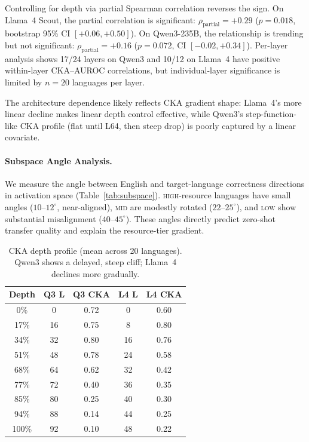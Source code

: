 \documentclass[11pt,a4paper]{article}
\newcommand{\auroc}{AUROC}
\begin{document}
Controlling for depth via partial Spearman correlation reverses the sign. On Llama~4 Scout, the partial correlation is significant: $\rho_{\text{partial}}=+0.29$ ($p=0.018$, bootstrap 95\% CI $[+0.06, +0.50]$). On Qwen3-235B, the relationship is trending but not significant: $\rho_{\text{partial}}=+0.16$ ($p=0.072$, CI $[-0.02, +0.34]$). Per-layer analysis shows 17/24 layers on Qwen3 and 10/12 on Llama~4 have positive within-layer CKA--\auroc{} correlations, but individual-layer significance is limited by $n=20$ languages per layer.

The architecture dependence likely reflects CKA gradient shape: Llama~4's more linear decline makes linear depth control effective, while Qwen3's step-function-like CKA profile (flat until L64, then steep drop) is poorly captured by a linear covariate.

\paragraph{Subspace Angle Analysis.}
We measure the angle between English and target-language correctness directions in activation space (Table~\ref{tab:subspace}). \textsc{high}-resource languages have small angles ($10$--$12^\circ$, near-aligned), \textsc{mid} are modestly rotated ($22$--$25^\circ$), and \textsc{low} show substantial misalignment ($40$--$45^\circ$). These angles directly predict zero-shot transfer quality and explain the resource-tier gradient.

\begin{table}[t]
\centering
\small
\begin{tabular}{ccccc}
\toprule
Depth & Q3 L & Q3 CKA & L4 L & L4 CKA \\
\midrule
0\%  & 0  & 0.72 & 0  & 0.60 \\
17\% & 16 & 0.75 & 8  & 0.80 \\
34\% & 32 & 0.80 & 16 & 0.76 \\
51\% & 48 & 0.78 & 24 & 0.58 \\
68\% & 64 & 0.62 & 32 & 0.42 \\
77\% & 72 & 0.40 & 36 & 0.35 \\
85\% & 80 & 0.25 & 40 & 0.30 \\
94\% & 88 & 0.14 & 44 & 0.25 \\
100\%& 92 & 0.10 & 48 & 0.22 \\
\bottomrule
\end{tabular}
\caption{CKA depth profile (mean across 20 languages). Qwen3 shows a delayed, steep cliff; Llama~4 declines more gradually.}
\label{tab:cka_depth}
\end{table}
\end{document}
